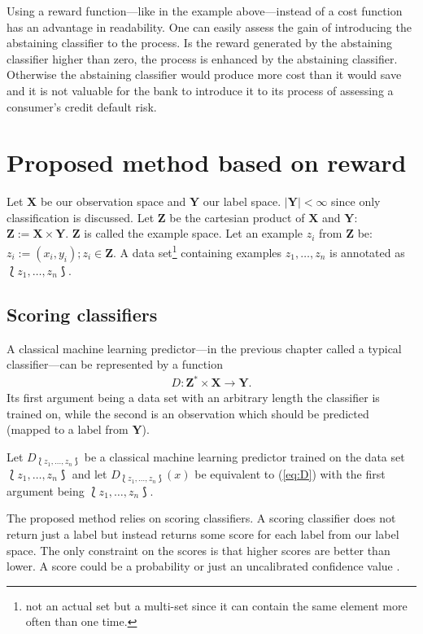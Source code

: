 \documentclass[twoside,11pt]{article}
\def\ds{\Lbag z_1,\dots,z_n \Rbag}
\begin{document}
Using a reward function---like in the example
above---instead of a cost function has an advantage in
readability. One can easily assess the gain of introducing
the abstaining classifier to the process.
Is the reward generated by the abstaining classifier higher
than zero, the process is enhanced by the abstaining
classifier.
Otherwise the abstaining classifier would produce more
cost than it would save and it is not valuable for the
bank to introduce it to its process of assessing a
consumer's credit default risk.

\section{Proposed method based on reward}
\label{sec:method}

Let $\textbf{X}$ be our observation space and $\textbf{Y}$
our label space. $|\textbf{Y}| < \infty$ since only
classification is discussed. Let $\textbf{Z}$ be the
cartesian product of $\textbf{X}$ and $\textbf{Y}$:
$\textbf{Z} := \textbf{X} \times \textbf{Y}$.
$\textbf{Z}$ is called the example space.
Let an example $z_i$ from $\textbf{Z}$ be:
$z_i := (x_i, y_i); z_i \in \textbf{Z}$.
A data set\footnote{not an actual set but a multi-set since
it can contain the same element more often than one time.}
containing examples $z_1,\dots,z_n$ is annotated as
$\ds$.

\subsection{Scoring classifiers}

A classical machine learning predictor---in the previous
chapter called a typical classifier---can be represented
by a function
\begin{align}
  \label{eq:D}
  D: \textbf{Z}^* \times \textbf{X} \rightarrow \textbf{Y}.
\end{align}
Its first argument being a data set with an arbitrary
length the classifier is trained on, while the second is an
observation which should be predicted
(mapped to a label from $\textbf{Y}$).

Let $D_{\ds}$ be a classical machine
learning predictor trained on the data set $\ds$ and
let $D_{\ds}(x)$ be equivalent to (\ref{eq:D}) with the
first argument being $\ds$.

The proposed method relies on scoring classifiers.
A scoring classifier does not return just
a label but instead returns some score for each label from
our label space.
The only constraint on the scores is that higher scores
are better than lower.
A score could be a probability or just an uncalibrated
confidence value \citep[see][]{vanderlooy_et_al_2009}.
\end{document}

